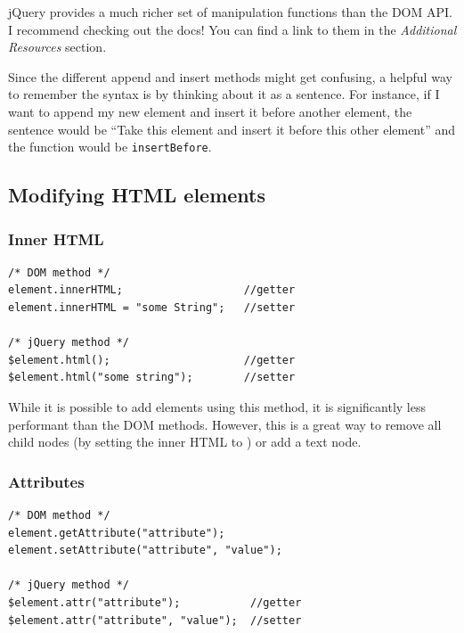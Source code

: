 \documentclass[12pt]{article}
\begin{document}
jQuery provides a much richer set of manipulation functions than the DOM API. I recommend checking out the docs! You can find a link to them in the \emph{Additional Resources} section.
\par
Since the different append and insert methods might get confusing, a helpful way to remember the syntax is by thinking about it as a sentence. For instance, if I want to append my new element and insert it before another element, the sentence would be ``Take this element and insert it before this other element'' and the function would be \texttt{insertBefore}.

\subsection{Modifying HTML elements}

\subsubsection*{Inner HTML}
\begin{Verbatim}[frame=single]
/* DOM method */
element.innerHTML;                   //getter
element.innerHTML = "some String";   //setter

/* jQuery method */
$element.html();                     //getter
$element.html("some string");        //setter
\end{Verbatim}
While it is possible to add elements using this method, it is significantly less performant than the DOM methods. However, this is a great way to remove all child nodes (by setting the inner HTML to \textquotedbl\textquotedbl) or add a text node.

\subsubsection*{Attributes}
\begin{Verbatim}[frame=single]
/* DOM method */
element.getAttribute("attribute");
element.setAttribute("attribute", "value");

/* jQuery method */
$element.attr("attribute");           //getter
$element.attr("attribute", "value");  //setter
\end{Verbatim}
\end{document}
